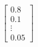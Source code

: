 \documentclass[preview]{standalone}
\begin{document}
\begin{align*}
\begin{bmatrix} 0.8 \\ 0.1 \\ \vdots \\ 0.05 \end{bmatrix}
\end{align*}
\end{document}
